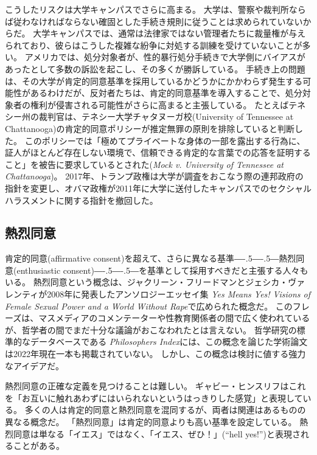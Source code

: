 \documentclass[paper=a4,book,openany]{jlreq}
\newcommand{\ig}[1]{}           %
\def\DDASH{―\kern-.5\zw―\kern-.5\zw―} %
\begin{document}
こうしたリスクは大学キャンパスでさらに高まる。
大学は、警察や裁判所ならば従わなければならない確固とした手続き規則に従うことは求められていないからだ。
大学キャンパスでは、通常は法律家ではない管理者たちに裁量権が与えられており、彼らはこうした複雑な紛争に対処する訓練を受けていないことが多い。
アメリカでは、処分対象者が、性的暴行処分手続きで大学側にバイアスがあったとして多数の訴訟を起こし、その多くが勝訴している\citep{anderson19:_more_title_ix_lawsuit_accus_accus}。
手続き上の問題は、その大学が肯定的同意基準を採用しているかどうかにかかわらず発生する可能性があるわけだが、反対者たちは、肯定的同意基準を導入することで、処分対象者の権利が侵害される可能性がさらに高まると主張している。
たとえばテネシー州の裁判官は、テネシー大学チャタヌーガ校(University of Tennessee at Chattanooga)の肯定的同意ポリシーが推定無罪の原則を排除していると判断した。
このポリシーでは「極めてプライベートな身体の一部を露出する行為に、証人がほとんど存在しない環境で、信頼できる肯定的な言葉での応答を証明すること」を被告に要求しているとされた(\emph{Mock v. University of Tennessee at Chattanooga}\ig{, No. 14-1687-II, Tenn. Ch. Ct. 10 August 2015\footnote{\url{https://kcjohnson.files.wordpress.com/2013/08/memorandum-mock.pdf}.}})。
2017年、トランプ政権は大学が調査をおこなう際の連邦政府の指針を変更し、オバマ政権が2011年に大学に送付したキャンパスでのセクシャルハラスメントに関する指針を撤回した。

\subsection{熱烈同意}

肯定的同意(affirmative consent)を超えて、さらに異なる基準{\DDASH}熱烈同意(enthusiastic consent){\DDASH}を基準として採用すべきだと主張する人々もいる。
熱烈同意という概念は、ジャクリーン・フリードマン\ig{Jaclyn Friedman}とジェシカ・ヴァレンティ\ig{Jessica Valenti}が2008年に発表したアンソロジーエッセイ集 \emph{Yes Means Yes! Visions of Female Sexual Power and a World Without Rape}で広められた概念だ\citep[pp.308--309]{friedman08:_yes_means_yes}。
このフレーズは、マスメディアのコメンテーターや性教育関係者の間で広く使われているが、哲学者の間でまだ十分な議論がおこなわれたとは言えない。
哲学研究の標準的なデータベースである \emph{Philosophers Index}には、この概念を論じた学術論文は2022年現在一本も掲載されていない。
しかし、この概念は検討に値する強力なアイデアだ。

熱烈同意の正確な定義を見つけることは難しい。
ギャビー・ヒンスリフ\ig{Gaby Hinsliff}はこれを「お互いに触れあわずにはいられないというはっきりした感覚」と表現している\citep{hinsliff15:_consen_is_not_enoug}。
多くの人は肯定的同意と熱烈同意を混同するが、両者は関連はあるものの異なる概念だ。
「熱烈同意」は肯定的同意よりも高い基準を設定している。
熱烈同意は単なる「イエス」ではなく、「イエス、ぜひ！」(``hell yes!'')と表現されることがある。
\end{document}
